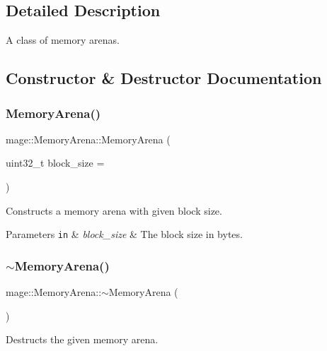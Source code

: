 \subsection{Detailed Description}
A class of memory arena\textquotesingle{}s. 

\subsection{Constructor \& Destructor Documentation}
\hypertarget{classmage_1_1_memory_arena_aa243c458adb14e211f4dd944c4c82148}{}\label{classmage_1_1_memory_arena_aa243c458adb14e211f4dd944c4c82148} 
\subsubsection{\texorpdfstring{Memory\+Arena()}{MemoryArena()}}
{\footnotesize\ttfamily mage\+::\+Memory\+Arena\+::\+Memory\+Arena (\begin{DoxyParamCaption}\item[{uint32\+\_\+t}]{block\+\_\+size = {} }\end{DoxyParamCaption})}

Constructs a memory arena with given block size.


\begin{DoxyParams}[1]{Parameters}
\mbox{\tt in}  & {\em block\+\_\+size} & The block size in bytes. \\
\hline
\end{DoxyParams}
\hypertarget{classmage_1_1_memory_arena_acfee6fc205e2eaf6aeef4acf19948e6e}{}\label{classmage_1_1_memory_arena_acfee6fc205e2eaf6aeef4acf19948e6e} 
\subsubsection{\texorpdfstring{$\sim$\+Memory\+Arena()}{~MemoryArena()}}
{\footnotesize\ttfamily mage\+::\+Memory\+Arena\+::$\sim$\+Memory\+Arena (\begin{DoxyParamCaption}{ }\end{DoxyParamCaption})}

Destructs the given memory arena. 

